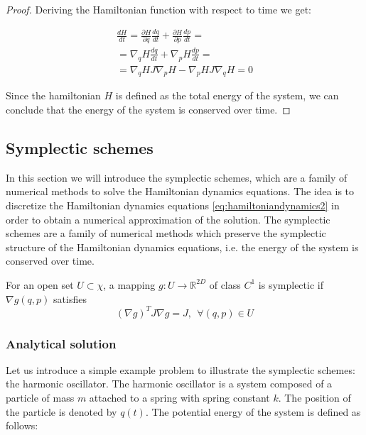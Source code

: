 \documentclass{article}
\begin{document}
\begin{proof}
	Deriving the Hamiltonian function with respect to time we get:

	\begin{gather*}
		\frac{dH}{dt} = \frac{\partial H}{\partial q} \frac{dq}{dt} + \frac{\partial H}{\partial p} \frac{dp}{dt} = \\ 
		= \nabla_q H \frac{dq}{dt} + \nabla_p H \frac{dp}{dt} = \\ 
		= \nabla_q H J \nabla_p H - \nabla_p H J \nabla_q H = 0
	\end{gather*}

	Since the hamiltonian \(H\) is defined as the total energy of the system, we can conclude that the energy of the system is conserved over time.
\end{proof}

\subsection{Symplectic schemes}
\label{sec:symplectic_schemes}

In this section we will introduce the symplectic schemes, which are a family of numerical methods to solve the Hamiltonian dynamics equations. The idea is to discretize the Hamiltonian dynamics equations \eqref{eq:hamiltoniandynamics2} in order to obtain a numerical approximation of the solution. The symplectic schemes are a family of numerical methods which preserve the symplectic structure of the Hamiltonian dynamics equations, i.e. the energy of the system is conserved over time.

\begin{definition}
	For an open set \(U \subset \chi \), a mapping \(g: U \rightarrow \mathbb{R}^{2D}\) of class \(C^1\) is symplectic if \(\nabla g(q,p)\) satisfies
	\[
		(\nabla g)^T J \nabla g = J, \ \ \forall (q,p) \in U
	\]
\end{definition}

\subsubsection{Analytical solution}
\label{sec:analytical_solution}

Let us introduce a simple example problem to illustrate the symplectic schemes: the harmonic oscillator. The harmonic oscillator is a system composed of a particle of mass \(m\) attached to a spring with spring constant \(k\). The position of the particle is denoted by \(q(t)\). The potential energy of the system is defined as follows:
\end{document}
